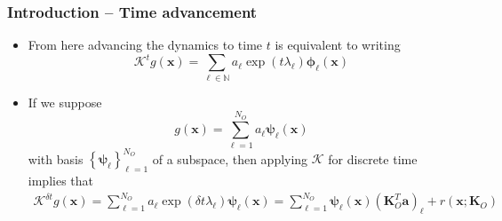 \documentclass[11pt,aspectratio=169]{beamer}
\newcommand{\bracks}[1]{\left\{#1\right\}}
\newcommand{\N}{\mathbb{N}}
\begin{document}
    \begin{frame}
        \frametitle{Introduction -- Time advancement}
        \begin{itemize}
            \item 
            From here advancing the dynamics to time $t$ is equivalent to writing
            \begin{equation}
                \mathcal{K}^{t} g(\boldsymbol{x}) = \sum_{\ell \in \N} a_\ell 
                \exp(t\lambda_\ell)\boldsymbol{\phi}_\ell (\boldsymbol{x})
            \end{equation} 
            \item
            If we suppose 
            \begin{equation}
                g(\boldsymbol{x}) = \sum_{\ell = 1}^{N_O} a_\ell \boldsymbol{\psi}_\ell
                (\boldsymbol{x}) 
            \end{equation}
            with basis $\bracks{\boldsymbol{\psi}_\ell}_{\ell=1}^{N_O}$ of a subspace, 
            then applying $\mathcal{K}$ for discrete time implies that
            \begin{align} 
                \mathcal{K}^{\delta t} g(\boldsymbol{x}) = \sum_{\ell = 1}^{N_O} a_\ell 
                \exp(\delta t\lambda_\ell)\boldsymbol{\psi}_\ell (\boldsymbol{x})
                = \sum_{\ell = 1}^{N_O} \boldsymbol{\psi}_\ell (\boldsymbol{x})
                (\boldsymbol{K}_O^T
                \boldsymbol{a})_\ell + r(\boldsymbol{x};\boldsymbol{K}_O)
            \end{align}
        \end{itemize}
    \end{frame}
\end{document}
